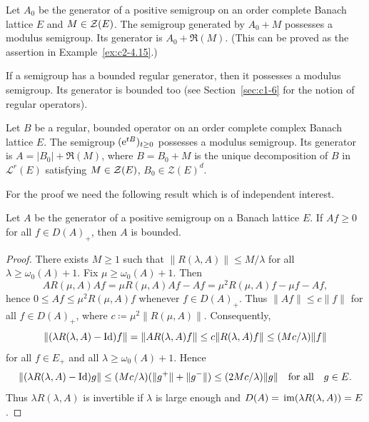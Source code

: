 \begin{example}\label{ex:c2-4.16}
Let $A_{0}$ be the generator of a positive semigroup on an order complete Banach lattice $E$ and $M \in \mathcal{Z}(E)$.
The semigroup generated by $A_{0} + M$ possesses a modulus semigroup. Its generator is $A_{0} + \Re(M)$. (This can be proved as the assertion in Example~\ref{ex:c2-4.15}.)
\end{example}
If a semigroup has a bounded regular generator, then it possesses a modulus semigroup. Its generator is bounded too (see Section~\ref{sec:c1-6} for the notion of regular operators).
\begin{theorem}\label{thm:c2-4.17}
Let $B$ be a regular, bounded operator on an order complete complex Banach lattice $E$. The semigroup $(\eu^{tB})_{t \geq 0}$ possesses a modulus semigroup. Its generator is $A = |B_{0}| + \Re(M)$, where $B = B_{0} + M$ is the unique decomposition of\/ $B$ in $\mathcal{L}^{r}(E)$ satisfying $M \in \mathcal{Z}(E)$, $B_{0} \in \mathcal{Z}(E)^{d}$.
\end{theorem}
For the proof we need the following result which is of independent interest.
\begin{lemma}\label{lem:c2-4.18}
Let $A$ be the generator of a positive semigroup on a Banach lattice $E$. 
If\/ $Af \geq 0$ for all $f \in D(A)_{+}$, then $A$ is bounded.
\end{lemma}
\begin{proof}%
There exists $M \geq 1$ such that $\|R(\lambda,A)\| \leq M/\lambda$ for all $\lambda \geq \omega_{0}(A)+1$.
Fix $\mu \geq \omega_{0}(A)+1$.
Then 
\[
AR(\mu,A)Af = \mu R(\mu,A)Af - Af = \mu^{2}R(\mu,A)f - \mu f - Af ,
\]
hence $0 \leq Af \leq \mu^{2}R(\mu,A)f$ whenever $f \in D(A)_{+}$.
Thus $\|Af\| \leq c\|f\|$ for all $f \in D(A)_{+}$, where $c \coloneq \mu^{2}\|R(\mu,A)\|$.
Consequently,
\[
\|(\lambda R(\lambda,A) - \Id)f\| = \|AR(\lambda,A)f\| \leq c\|R(\lambda,A)f\| \leq (Mc/\lambda)\|f\| 
\]
for all $f \in E_{+}$ and all $ \lambda \geq \omega_{0}(A)+1$. 
Hence
\[
\|(\lambda R(\lambda,A) - \Id)g\| \leq (Mc/\lambda)(\|g^{+}\| + \|g^{-}\|) \leq (2Mc/\lambda)\|g\| \quad \text{for all} \quad g \in E .
\]
Thus $\lambda R(\lambda,A)$ is invertible if\/ $\lambda$ is large enough and
$D(A) = \mathop{}\mathrm{im}(\lambda R(\lambda,A)) = E$.
\end{proof}
